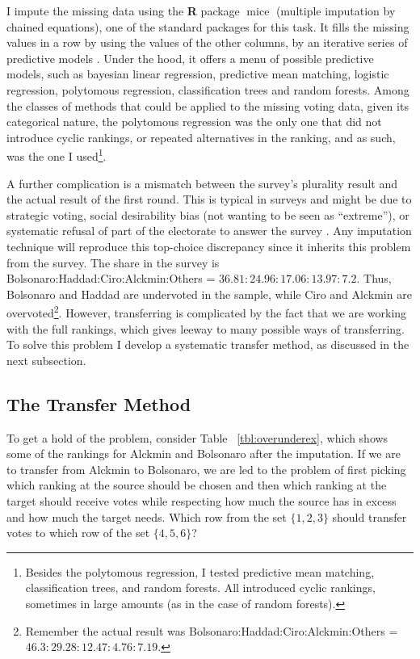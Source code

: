 \documentclass[hidelinks,11pt]{article} \usepackage[utf8]{inputenc}
\begin{document}
I impute the missing data using the \textbf{\textsf{R}} package
\(\operatorname{mice}\) (multiple imputation by chained equations), one of the
standard packages for this task. It fills the missing values in a row by using
the values of the other columns, by an iterative series of predictive models
\parencite{vanbuuren2018imputation}. Under the hood, it offers a menu of
possible predictive models, such as bayesian linear regression, predictive mean
matching, logistic regression, polytomous regression, classification trees and
random forests. Among the classes of methods that could be applied to the
missing voting data, given its categorical nature, the polytomous regression was
the only one that did not introduce cyclic rankings, or repeated alternatives in
the ranking, and as such, was the one I used\footnote{Besides the polytomous
regression, I tested predictive mean matching, classification trees, and random
forests. All introduced cyclic rankings, sometimes in large amounts (as in the
case of random forests).}.


A further complication is a mismatch between the survey's plurality result and
the actual result of the first round. This is typical in surveys and might be
due to strategic voting, social desirability bias (not wanting to be seen as
``extreme''), or systematic refusal of part of the electorate to answer the
survey \parencite{nishimura2016alternative}. Any imputation technique will
reproduce this top-choice discrepancy since it inherits this problem from the
survey. The share in the survey is Bolsonaro:Haddad:Ciro:Alckmin:Others =
\(36.81 : 24.96 : 17.06: 13.97 : 7.2 \). Thus, Bolsonaro and Haddad are
undervoted in the sample, while Ciro and Alckmin are overvoted\footnote{Remember the actual result was Bolsonaro:Haddad:Ciro:Alckmin:Others = \(46.3 : 29.28 : 12.47 : 4.76 : 7.19 \).}. However,
transferring is complicated by the fact that we are working with the full
rankings, which gives leeway to many possible ways of transferring. To solve
this problem I develop a systematic transfer method, as discussed in the next
subsection.

\subsection{The Transfer Method}
To get a hold of the problem,  consider Table
~\ref{tbl:overunderex}, which shows some of the rankings for Alckmin and
Bolsonaro after the imputation. If we are to transfer from Alckmin to Bolsonaro,
we are led to the problem of first picking which ranking at the source should be
chosen and then which ranking at the target should receive votes while
respecting how much the source has in excess and how much the target needs.
Which row from the set \(\{1,2,3\}\) should transfer votes to which row of the
set \(\{4,5,6\}\)?
\end{document}
